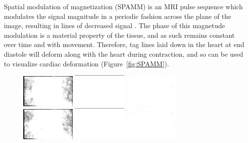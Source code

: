 Spatial modulation of magnetization (SPAMM) is an MRI pulse sequence which modulates the signal magnitude in a periodic fashion across the plane of the image, resulting in lines of decreased signal \cite{Axel1989}.  The phase of this magnetude modulation is a material property of the tissue, and as such remains constant over time and with movement.  Therefore, tag lines laid down in the heart at end diastole will deform along with the heart during contraction, and so can be used to visualize cardiac deformation (Figure~\ref{fig:SPAMM}).

\begin{figure}[h]
\center
\includegraphics[trim = 100px 40px 110px 34px, clip, width=0.24\textwidth]{images/canine/ssfp_ed.png}
\includegraphics[trim = 100px 50px 110px 30px, clip, width=0.24\textwidth]{images/canine/spamm_ed.png}
\includegraphics[trim = 100px 50px 110px 30px, clip, width=0.24\textwidth]{images/input/wrapped_harp_ed.png} \\
\includegraphics[trim = 100px 40px 110px 34px, clip, width=0.24\textwidth]{images/canine/ssfp_es.png}
\includegraphics[trim = 100px 50px 110px 30px, clip, width=0.24\textwidth]{images/canine/spamm_es.png}
\includegraphics[trim = 100px 50px 110px 30px, clip, width=0.24\textwidth]{images/input/wrapped_harp.png}


\end{figure}
